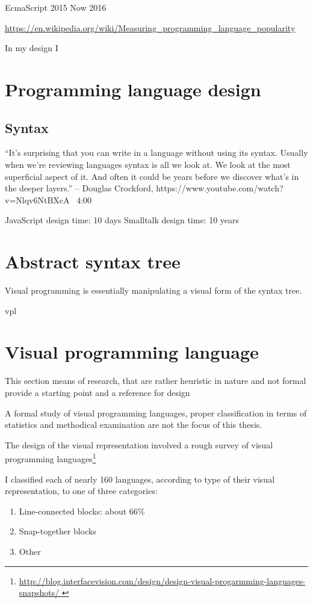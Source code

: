 EcmaScript 2015
Now 2016

\url{https://en.wikipedia.org/wiki/Measuring_programming_language_popularity}

In my design I 


\section{Programming language design}

\subsection{Syntax}

``It's surprising that you can write in a language without using its syntax. Usually when we're reviewing languages syntax is all we look at. We look at the most superficial aspect of it. And often it could be years before we discover what's in the deeper layers.''
-- Douglas Crockford, https://www.youtube.com/watch?v=Nlqv6NtBXcA ~4:00

JavaScript design time: 10 days
Smalltalk design time: 10 years


\section{Abstract syntax tree}

Visual programming is essentially manipulating a visual form of the syntax tree.

\acrlong{vpl}

\section{Visual programming language}
This section 
means of research, that are rather heuristic in nature and not formal
provide a starting point and a reference for design

A formal study of visual programming languages, proper classification in terms of statistics and methodical examination are not the focus of this thesis.

The design of the visual representation involved a rough survey of visual programming languages\footnote{\url{http://blog.interfacevision.com/design/design-visual-progarmming-languages-snapshots/ 
}}

I classified each of nearly 160 languages, according to type of their visual representation, to one of three categories:
\begin{enumerate}
    \item Line-connected blocks: about 66\%
    \item Snap-together blocks
    \item Other
\end{enumerate}

